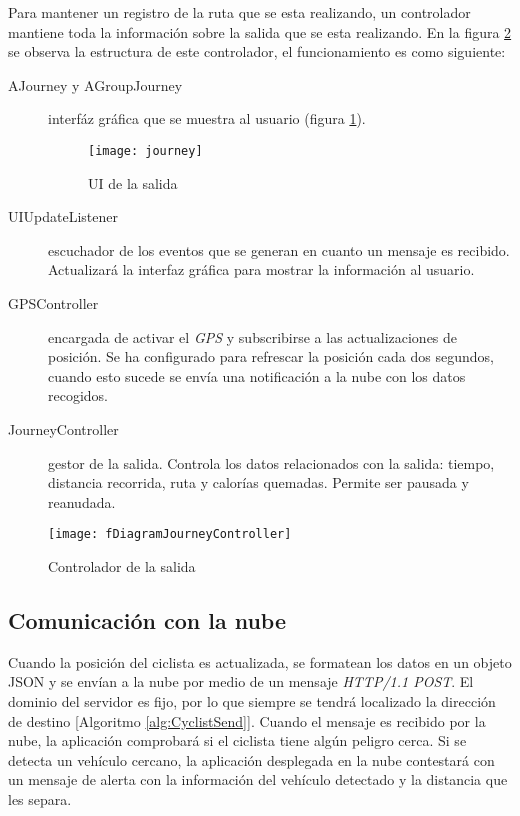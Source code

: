 Para mantener un registro de la ruta que se esta realizando, un controlador mantiene toda la información sobre la salida que se esta realizando. En la figura \ref{figure:DiagramController} se observa la estructura de este controlador, el funcionamiento es como siguiente:
\begin{description}
	\item[AJourney y AGroupJourney] interfáz gráfica que se muestra al usuario (figura \ref{figure:Journey}).
	\begin{figure}[H]
		\begin{center}
			\texttt{[image: journey]}
			\caption{UI de la salida}
			\label{figure:Journey}
		\end{center}
	\end{figure}			
	\item[UIUpdateListener] escuchador de los eventos que se generan en cuanto un mensaje es recibido. Actualizará la interfaz gráfica para mostrar la información al usuario.
	\item[GPSController] encargada de activar el \emph{GPS} y subscribirse a las actualizaciones de posición. Se ha configurado para refrescar la posición cada dos segundos, cuando esto sucede se envía una notificación a la nube con los datos recogidos.
	\item[JourneyController] gestor de la salida. Controla los datos relacionados con la salida: tiempo, distancia recorrida, ruta y calorías quemadas. Permite ser pausada y reanudada.
\end{description}
		
\begin{figure}[H]
	\begin{center}
	\texttt{[image: fDiagramJourneyController]}
	\caption{Controlador de la salida}
	\label{figure:DiagramController}
	\end{center}
\end{figure}
		
\subsection{Comunicación con la nube}\label{ssection:comunicacion_nube}
Cuando la posición del ciclista es actualizada, se formatean los datos en un objeto JSON y se envían a la nube por medio de un mensaje \emph{HTTP/1.1 POST}. El dominio del servidor es fijo, por lo que siempre se tendrá localizado la dirección de destino [Algoritmo \ref{alg:CyclistSend}]. Cuando el mensaje es recibido por la nube, la aplicación comprobará si el ciclista tiene algún peligro cerca. Si se detecta un vehículo cercano, la aplicación desplegada en la nube contestará con un mensaje de alerta con la información del vehículo detectado y la distancia que les separa.

